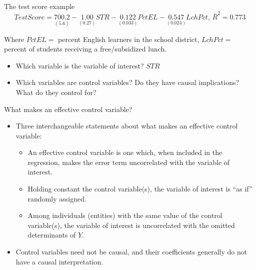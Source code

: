\documentclass[presentation,10pt]{beamer}
\begin{document}
\begin{frame}[label={sec:orgcb25ccf}]{The test score example}
\[TestScore = \underset{(5.6)}{700.2} - \underset{(0.27)}{1.00}STR -
\underset{(0.033)}{0.122}PctEL - \underset{(0.024)}{0.547}LchPct,\,
\bar{R}^2 = 0.773 \]

Where \(PctEL=\) percent English learners in the school district,
\(LchPct=\) percent of students receiving a free/subsidized lunch.

\begin{itemize}
\item Which variable is the variable of interest? \(STR\)
\item Which variables are control variables? Do they have causal
implications? What do they control for?
\end{itemize}
\end{frame}

\begin{frame}[label={sec:org35cbf6f}]{What makes an effective control variable?}
\begin{itemize}
\item Three interchangeable statements about what makes an effective control
variable:
\begin{itemize}
\item An effective control variable is one which, when included in
the regression, makes the error term uncorrelated with the variable of
interest.
\item Holding constant the control variable(s), the variable of interest
is “as if” randomly assigned.
\item Among individuals (entities) with the same value of the control
variable(s), the variable of interest is uncorrelated with the
omitted determinants of \(Y\).
\end{itemize}

\item Control variables need not be causal, and their coefficients
generally do not have a causal interpretation.
\end{itemize}
\end{frame}
\end{document}
